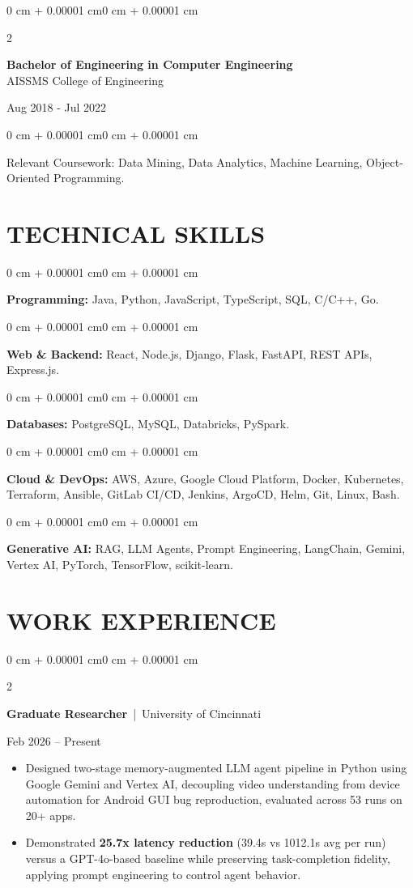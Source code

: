 \documentclass[10pt, letterpaper]{article}
\newenvironment{highlights}{
    \begin{itemize}[
        topsep=0.10 cm,
        parsep=0.06 cm,
        partopsep=0pt,
        itemsep=0.06 cm,
        leftmargin=12pt
    ]
}{
    \end{itemize}
}
\newenvironment{onecolentry}{
    \begin{adjustwidth}{0 cm + 0.00001 cm}{0 cm + 0.00001 cm}
}{
    \end{adjustwidth}
}
\newenvironment{twocolentry}[2][]{
    \onecolentry
    \def\secondColumn{#2}
    \setcolumnwidth{\fill, 4.5 cm}
    \begin{paracol}{2}
}{
    \switchcolumn \raggedleft \secondColumn
    \end{paracol}
    \endonecolentry
}
\begin{document}
\begin{twocolentry}{
    Aug 2018 - Jul 2022
}
    \textbf{Bachelor of Engineering in Computer Engineering} \\
    AISSMS College of Engineering
\end{twocolentry}
\begin{onecolentry}
Relevant Coursework: Data Mining, Data Analytics, Machine Learning, Object-Oriented Programming.
\end{onecolentry}
\section{TECHNICAL SKILLS}
\begin{onecolentry}
\textbf{Programming:} Java, Python, JavaScript, TypeScript, SQL, C/C++, Go.
\end{onecolentry}
\vspace{0.06 cm}
\begin{onecolentry}
\textbf{Web \& Backend:} React, Node.js, Django, Flask, FastAPI, REST APIs, Express.js.
\end{onecolentry}
\vspace{0.06 cm}
\begin{onecolentry}
\textbf{Databases:} PostgreSQL, MySQL, Databricks, PySpark.
\end{onecolentry}
\vspace{0.06 cm}
\begin{onecolentry}
\textbf{Cloud \& DevOps:} AWS, Azure, Google Cloud Platform, Docker, Kubernetes, Terraform, Ansible, GitLab CI/CD, Jenkins, ArgoCD, Helm, Git, Linux, Bash.
\end{onecolentry}
\vspace{0.06 cm}
\begin{onecolentry}
\textbf{Generative AI:} RAG, LLM Agents, Prompt Engineering, LangChain, Gemini, Vertex AI, PyTorch, TensorFlow, scikit-learn.
\end{onecolentry}

\section{WORK EXPERIENCE}
\begin{twocolentry}{Feb 2026 -- Present}
\textbf{Graduate Researcher} \,|\, University of Cincinnati
\end{twocolentry}
\begin{highlights}
  \item Designed two-stage memory-augmented LLM agent pipeline in Python using Google Gemini and Vertex AI, decoupling video understanding from device automation for Android GUI bug reproduction, evaluated across 53 runs on 20+ apps.
  \item Demonstrated \textbf{25.7x latency reduction} (39.4s vs 1012.1s avg per run) versus a GPT-4o-based baseline while preserving task-completion fidelity, applying prompt engineering to control agent behavior.
\end{highlights}
\end{document}
